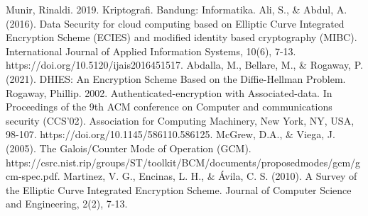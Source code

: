 \documentclass[conference]{IEEEtran}
\begin{document}
\begin{thebibliography}{00}
     Munir, Rinaldi. 2019. Kriptografi. Bandung: Informatika.
     Ali, S., \& Abdul, A. (2016). Data Security for cloud computing based on Elliptic Curve Integrated Encryption Scheme (ECIES) and modified identity based cryptography (MIBC). International Journal of Applied Information Systems, 10(6), 7-13. https://doi.org/10.5120/ijais2016451517.
     Abdalla, M., Bellare, M., \& Rogaway, P. (2021). DHIES: An Encryption Scheme Based on the Diffie-Hellman Problem.
     Rogaway, Phillip. 2002. Authenticated-encryption with Associated-data. In Proceedings of the 9th ACM conference on Computer and communications security (CCS'02). Association for Computing Machinery, New York, NY, USA, 98-107. https://doi.org/10.1145/586110.586125.
     McGrew, D.A., \& Viega, J. (2005). The Galois/Counter Mode of Operation (GCM). https://csrc.nist.rip/groups/ST/toolkit/BCM/documents/proposedmodes/gcm/gcm-spec.pdf.
     Martinez, V. G., Encinas, L. H., \& Ávila, C. S. (2010). A Survey of the Elliptic Curve Integrated Encryption Scheme. Journal of Computer Science and Engineering, 2(2), 7-13. 
\end{thebibliography}
\end{document}
